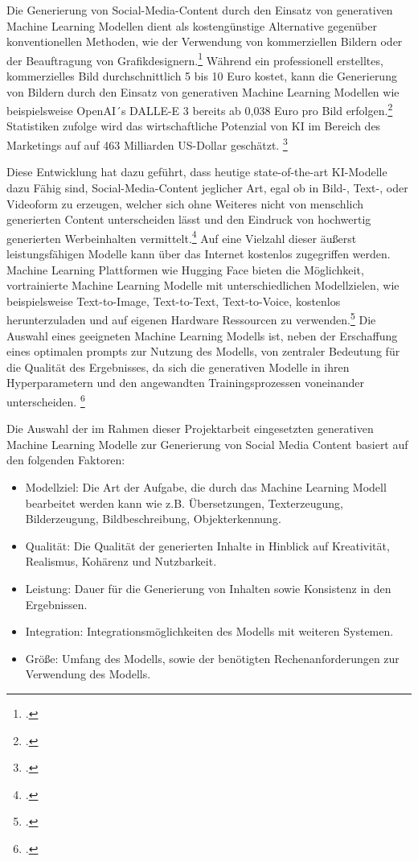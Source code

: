 Die Generierung von Social-Media-Content durch den Einsatz von generativen Machine Learning Modellen dient als kostengünstige Alternative gegenüber konventionellen Methoden, wie der Verwendung von kommerziellen Bildern oder der Beauftragung von Grafikdesignern.\footcite[1-2]{hartmann2024power}
Während ein professionell erstelltes, kommerzielles Bild durchschnittlich 5 bis 10 Euro kostet, kann die Generierung von Bildern durch den Einsatz von generativen Machine Learning Modellen wie beispielsweise OpenAI´s DALLE-E 3 bereits ab 0,038 Euro pro Bild erfolgen.\footcite{betker2023improving}
Statistiken zufolge wird das wirtschaftliche Potenzial von KI im Bereich des Marketings auf auf 463 Milliarden US-Dollar geschätzt. \footcite{chui2023economic}

Diese Entwicklung hat dazu geführt, dass heutige state-of-the-art KI-Modelle dazu Fähig sind, Social-Media-Content jeglicher Art, egal ob in Bild-, Text-, oder Videoform zu erzeugen, welcher sich ohne Weiteres nicht von menschlich generierten Content unterscheiden lässt und den Eindruck von hochwertig generierten Werbeinhalten vermittelt.\footcite[1]{hartmann2024power}
Auf eine Vielzahl dieser äußerst leistungsfähigen Modelle kann über das Internet kostenlos zugegriffen werden.
Machine Learning Plattformen wie Hugging Face bieten die Möglichkeit, vortrainierte Machine Learning Modelle mit unterschiedlichen Modellzielen, wie beispielsweise Text-to-Image, Text-to-Text, Text-to-Voice, kostenlos herunterzuladen und auf eigenen Hardware Ressourcen zu verwenden.\footcite{huggingface}
Die Auswahl eines geeigneten Machine Learning Modells ist, neben der Erschaffung eines optimalen prompts zur Nutzung des Modells, von zentraler Bedeutung für die Qualität des Ergebnisses, da sich die generativen Modelle in ihren Hyperparametern und den angewandten Trainingsprozessen voneinander unterscheiden. \footcite[S. 9 ff.]{betker2023improving}

Die Auswahl der im Rahmen dieser Projektarbeit eingesetzten generativen Machine Learning Modelle zur Generierung von Social Media Content basiert auf den folgenden Faktoren:

\begin{itemize}
    \item Modellziel: Die Art der Aufgabe, die durch das Machine Learning Modell bearbeitet werden kann wie z.B. Übersetzungen, Texterzeugung, Bilderzeugung, Bildbeschreibung, Objekterkennung.
    \item Qualität: Die Qualität der generierten Inhalte in Hinblick auf Kreativität, Realismus, Kohärenz und Nutzbarkeit.
    \item Leistung: Dauer für die Generierung von Inhalten sowie Konsistenz in den Ergebnissen.
    \item Integration: Integrationsmöglichkeiten des Modells mit weiteren Systemen.
    \item Größe: Umfang des Modells, sowie der benötigten Rechenanforderungen zur Verwendung des Modells.
\end{itemize}

